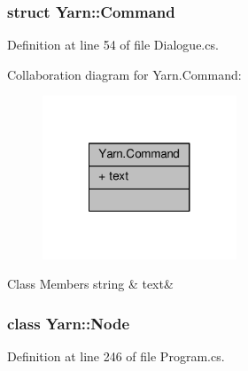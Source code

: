 \subsubsection{struct Yarn\-:\-:Command}


Definition at line 54 of file Dialogue.\-cs.



Collaboration diagram for Yarn.\-Command\-:
\nopagebreak
\begin{figure}[H]
\begin{center}
\leavevmode
\includegraphics[width=164pt]{a00374}
\end{center}
\end{figure}
\begin{DoxyFields}{Class Members}
\hypertarget{a00041_a8564e5104566e145f5d917ec846444d9}{string}\label{a00041_a8564e5104566e145f5d917ec846444d9}
&
text&
\\
\hline

\end{DoxyFields}
\label{a00361}
\hypertarget{a00041_a00361}{}
\subsubsection{class Yarn\-:\-:Node}


Definition at line 246 of file Program.\-cs.



